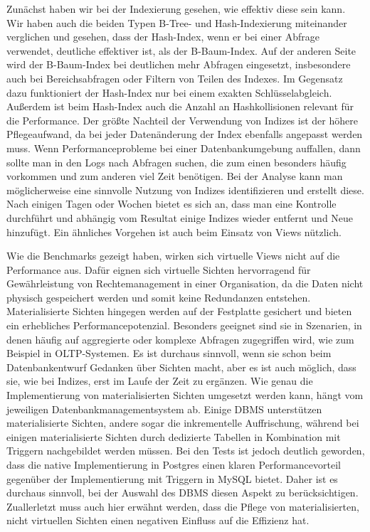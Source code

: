 Zunächst haben wir bei der Indexierung gesehen, wie effektiv diese sein kann.
Wir haben auch die beiden Typen B-Tree- und Hash-Indexierung miteinander verglichen und gesehen, dass der Hash-Index, wenn er bei einer Abfrage verwendet, deutliche effektiver ist, als der B-Baum-Index.
Auf der anderen Seite wird der B-Baum-Index bei deutlichen mehr Abfragen eingesetzt, insbesondere auch bei Bereichsabfragen oder Filtern von Teilen des Indexes.
Im Gegensatz dazu funktioniert der Hash-Index nur bei einem exakten Schlüsselabgleich.
Außerdem ist beim Hash-Index auch die Anzahl an Hashkollisionen relevant für die Performance.
Der größte Nachteil der Verwendung von Indizes ist der höhere Pflegeaufwand, da bei jeder Datenänderung der Index ebenfalls angepasst werden muss.
Wenn Performanceprobleme bei einer Datenbankumgebung auffallen, dann sollte man in den Logs nach Abfragen suchen, die zum einen besonders häufig vorkommen und zum anderen viel Zeit benötigen.
Bei der Analyse kann man möglicherweise eine sinnvolle Nutzung von Indizes identifizieren und erstellt diese.
Nach einigen Tagen oder Wochen bietet es sich an, dass man eine Kontrolle durchführt und abhängig vom Resultat einige Indizes wieder entfernt und Neue hinzufügt.
Ein ähnliches Vorgehen ist auch beim Einsatz von Views nützlich.

Wie die Benchmarks gezeigt haben, wirken sich virtuelle Views nicht auf die Performance aus.
Dafür eignen sich virtuelle Sichten hervorragend für Gewährleistung von Rechtemanagement in einer Organisation, da die Daten nicht physisch gespeichert werden und somit keine Redundanzen entstehen.
Materialisierte Sichten hingegen werden auf der Festplatte gesichert und bieten ein erhebliches Performancepotenzial.
Besonders geeignet sind sie in Szenarien, in denen häufig auf aggregierte oder komplexe Abfragen zugegriffen wird, wie zum Beispiel in OLTP-Systemen.
Es ist durchaus sinnvoll, wenn sie schon beim Datenbankentwurf Gedanken über Sichten macht, aber es ist auch möglich, dass sie, wie bei Indizes, erst im Laufe der Zeit zu ergänzen.
Wie genau die Implementierung von materialisierten Sichten umgesetzt werden kann, hängt vom jeweiligen Datenbankmanagementsystem ab.
Einige DBMS unterstützen materialisierte Sichten, andere sogar die inkrementelle Auffrischung, während bei einigen materialisierte Sichten durch dedizierte Tabellen in Kombination mit Triggern nachgebildet werden müssen.
Bei den Tests ist jedoch deutlich geworden, dass die native Implementierung in Postgres einen klaren Performancevorteil gegenüber der Implementierung mit Triggern in MySQL bietet.
Daher ist es durchaus sinnvoll, bei der Auswahl des DBMS diesen Aspekt zu berücksichtigen.
Zuallerletzt muss auch hier erwähnt werden, dass die Pflege von materialisierten, nicht virtuellen Sichten einen negativen Einfluss auf die Effizienz hat.

